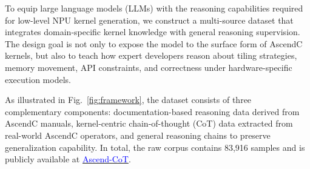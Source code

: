To equip large language models (LLMs) with the reasoning capabilities required for low-level NPU kernel generation, we construct a multi-source dataset that integrates domain-specific kernel knowledge with general reasoning supervision. The design goal is not only to expose the model to the surface form of AscendC kernels, but also to teach how expert developers reason about tiling strategies, memory movement, API constraints, and correctness under hardware-specific execution models.

As illustrated in Fig.~\ref{fig:framework}, the dataset consists of three complementary components: documentation-based reasoning data derived from AscendC manuals, kernel-centric chain-of-thought (CoT) data extracted from real-world AscendC operators, and general reasoning chains to preserve generalization capability. In total, the raw corpus contains 83,916 samples and is publicly available at \href{https://huggingface.co/AscendKernelGen/datasets}{\textcolor{blue}{Ascend-CoT}}.

